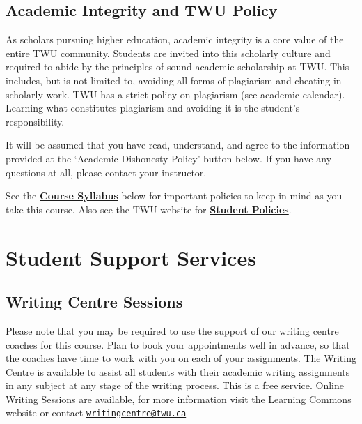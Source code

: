 \documentclass[
  letterpaper,
  DIV=11,
  numbers=noendperiod]{scrreprt}
\begin{document}
\section{Academic Integrity and TWU
Policy}\label{academic-integrity-and-twu-policy}

As scholars pursuing higher education, academic integrity is a core
value of the entire TWU community. Students are invited into this
scholarly culture and required to abide by the principles of sound
academic scholarship at TWU. This includes, but is not limited to,
avoiding all forms of plagiarism and cheating in scholarly work. TWU has
a strict policy on plagiarism (see academic calendar). Learning what
constitutes plagiarism and avoiding it is the student's responsibility.

It will be assumed that you have read, understand, and agree to the
information provided at the `Academic Dishonesty Policy' button below.
If you have any questions at all, please contact your instructor.

See the
\href{https://learn.twu.ca/mod/resource/view.php?id=1171447}{\textbf{Course
Syllabus}} below for important policies to keep in mind as you take this
course. Also see the TWU website for
\href{https://www.twu.ca/about-us/policies-guidelines/student-policies}{\textbf{Student
Policies}}.


\chapter{Student Support Services}\label{student-support-services}

\section{Writing Centre Sessions}\label{writing-centre-sessions}

Please note that you may be required to use the support of our writing
centre coaches for this course. Plan to book your appointments well in
advance, so that the coaches have time to work with you on each of your
assignments. The Writing Centre is available to assist all students with
their academic writing assignments in any subject at any stage of the
writing process. This is a free service. Online Writing Sessions are
available, for more information visit the
\href{https://create.twu.ca/learningcommons/}{Learning Commons} website
or contact
\href{mailto:writingcentre@twu.ca}{\nolinkurl{writingcentre@twu.ca}}
\end{document}
